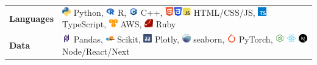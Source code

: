 \documentclass[12pt]{article}
\begin{document}
\hspace{-2.5em} \begin{tabular}{>{\raggedright}p{} p{}}
  \textbf{Languages} & \includegraphics[height=1em]{icons/python-icon} Python, \includegraphics[height=1em]{icons/r-icon} R, \includegraphics[height=1em]{icons/cpp-icon}  C++, \includegraphics[height=1em]{icons/w3_html5-icon}\includegraphics[height=1em]{icons/w3_css-icon}\includegraphics[height=1em]{icons/js-icon} HTML/CSS/JS, \includegraphics[height=1em]{icons/typescriptlang-icon} TypeScript, \includegraphics[height=1em]{icons/amazon_aws-icon} AWS, \includegraphics[height=1em]{icons/ruby-lang-icon} Ruby \\
  \textbf{Data} & \includegraphics[height=1em]{icons/Pandas} Pandas, \includegraphics[height=1em]{icons/scikit-learn} Scikit, \includegraphics[height=1em]{icons/Ploty} Plotly, \includegraphics[height=1em]{icons/seaborn-icon} seaborn, \includegraphics[height=1em]{icons/pytorch-icon} PyTorch, \includegraphics[height=1em]{icons/node-icon} \includegraphics[height=1em]{icons/react-icon} \includegraphics[height=1em]{icons/Next.js} Node/React/Next
\end{tabular}
\vspace{1em}
\end{document}
